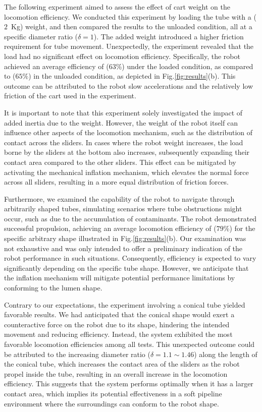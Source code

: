 \documentclass[letterpaper, 10 pt, conference]{ieeeconf}  %
\begin{document}
The following experiment aimed to assess the effect of cart weight on the locomotion efficiency. We conducted this experiment by loading the tube with a ($2$~Kg) weight, and then compared the results to the unloaded condition, all at a specific diameter ratio ($\delta=1$). The added weight introduced a higher friction requirement for tube movement. Unexpectedly, the experiment revealed that the load had no significant effect on locomotion efficiency. Specifically, the robot achieved an average efficiency of ($63\%$) under the loaded condition, as compared to ($65\%$) in the unloaded condition, as depicted in Fig.\ref{fig:results}(b). This outcome can be attributed to the robot slow accelerations and the relatively low friction of the cart used in the experiment.

It is important to note that this experiment solely investigated the impact of added inertia due to the weight. However, the weight of the robot itself can influence other aspects of the locomotion mechanism, such as the distribution of contact across the sliders. In cases where the robot weight increases, the load borne by the sliders at the bottom also increases, subsequently expanding their contact area compared to the other sliders. This effect can be mitigated by activating the mechanical inflation mechanism, which elevates the normal force across all sliders, resulting in a more equal distribution of friction forces.

Furthermore, we examined the capability of the robot to navigate through arbitrarily shaped tubes, simulating scenarios where tube obstructions might occur, such as due to the accumulation of contaminants. The robot demonstrated successful propulsion, achieving an average locomotion efficiency of ($79\%$) for the specific arbitrary shape illustrated in Fig.\ref{fig:results}(b). Our examination was not exhaustive and was only intended to offer a preliminary indication of the robot performance in such situations. Consequently, efficiency is expected to vary significantly depending on the specific tube shape. However, we anticipate that the inflation mechanism will mitigate potential performance limitations by conforming to the lumen shape. 

Contrary to our expectations, the experiment involving a conical tube yielded favorable results. We had anticipated that the conical shape would exert a counteractive force on the robot due to its shape, hindering the intended movement and reducing efficiency. Instead, the system exhibited the most favorable locomotion efficiencies among all tests. This unexpected outcome could be attributed to the increasing diameter ratio ($\delta=1.1\sim1.46$) along the length of the conical tube, which increases the contact area of the sliders as the robot propel inside the tube, resulting in an overall increase in the locomotion efficiency. This suggests that the system performs optimally when it has a larger contact area, which implies its potential effectiveness in a soft pipeline environment where the surroundings can conform to the robot shape. 
\end{document}
